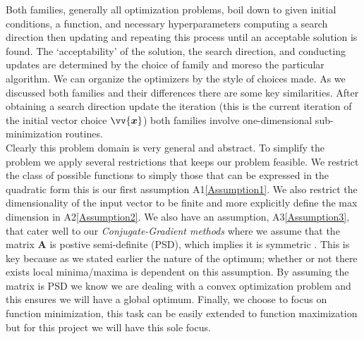 \documentclass[12pt]{article}
\begin{document}
Both families, generally all optimization problems, boil down to given initial conditions, a function, and necessary hyperparameters computing a search direction then updating and repeating this process until an acceptable solution is found. The `acceptability' of the solution, the search direction, and conducting updates are determined by the choice of family and moreso the particular algorithm. We can organize the optimizers by the style of choices made. As we discussed both families and their differences there are some key similarities. After obtaining a search direction update the iteration (this is the current iteration of the initial vector choice $\vv{\bm{x}}$) both families involve one-dimensional sub-minimization routines. 
\\

Clearly this problem domain is very general and abstract. To simplify the problem we apply several restrictions that keeps our problem feasible. We restrict the class of possible functions to simply those that can be expressed in the quadratic form this is our first assumption A1\ref{Assumption1}. We also restrict the dimensionality of the input vector to be finite and more explicitly define the max dimension in A2\ref{Assumption2}. We also have an assumption, A3\ref{Assumption3}, that cater well to our \textit{Conjugate-Gradient methods} where we assume that the matrix $\mathbf{A}$ is postive semi-definite (PSD), which implies it is symmetric \citep{Boyd2005ConvexO}. This is key because as we stated earlier the nature of the optimum; whether or not there exists local minima/maxima is dependent on this assumption. By assuming the matrix is PSD we know we are dealing with a convex optimization problem and this ensures we will have a global optimum. Finally, we choose to focus on function minimization, this task can be easily extended to function maximization but for this project we will have this sole focus.


\end{document}
